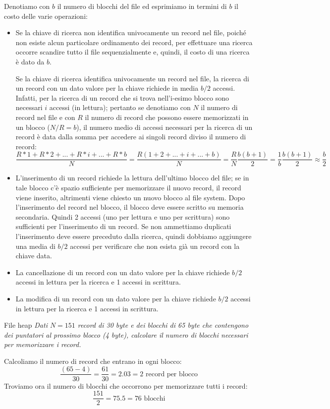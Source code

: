 Denotiamo con $b$ il numero di blocchi del file ed esprimiamo in termini di $b$ il costo delle varie operazioni:
\begin{itemize}
    \item Se la chiave di ricerca non identifica univocamente un record nel file, poiché non esiste alcun particolare ordinamento dei record, per effettuare una ricerca occorre scandire tutto il file sequenzialmente e, quindi, il costo di una ricerca è dato da $b$. 

    Se la chiave di ricerca identifica univocamente un record nel file, la ricerca di un record con un dato valore per la chiave richiede in media $b/2$ accessi. Infatti, per la ricerca di un record che si trova nell'i-esimo blocco sono necessari $i$ accessi (in lettura); pertanto se denotiamo con $N$ il numero di record nel file e con $R$ il numero di record che possono essere memorizzati in un blocco ($N/R=b$), il numero medio di accessi necessari per la ricerca di un record è data dalla somma per accedere ai singoli record diviso il numero di record:
    \begin{equation*}
        \frac{R*1+R*2+...+R*i+...+R*b}{N}=\frac{R(1+2+...+i+...+b)}{N}=\frac{R}{N}\frac{b(b+1)}{2}=\frac{1}{b}\frac{b(b+1)}{2}\approx \frac{b}{2}
    \end{equation*}
    \item L'inserimento di un record richiede la lettura dell'ultimo blocco del file; se in tale blocco c'è spazio sufficiente per memorizzare il nuovo record, il record viene inserito, altrimenti viene chiesto un nuovo blocco al file system. Dopo l'inserimento del record nel blocco, il blocco deve essere scritto su memoria secondaria. Quindi 2 accessi (uno per lettura e uno per scrittura) sono sufficienti per l'inserimento di un record. Se non ammettiamo duplicati l'inserimento deve essere preceduto dalla ricerca, quindi dobbiamo aggiungere una media di $b/2$ accessi per verificare che non esista già un record con la chiave data.
    \item La cancellazione di un record con un dato valore per la chiave richiede $b/2$ accessi in lettura per la ricerca e 1 accessi in scrittura.
    \item La modifica di un record con un dato valore per la chiave richiede $b/2$ accessi in lettura per la ricerca e 1 accessi in scrittura.
\end{itemize}

\begin{Example}{File heap}{}
    \textit{Dati $N=151$ record di 30 byte e dei blocchi di 65 byte che contengono dei puntatori al prossimo blocco (4 byte), calcolare il numero di blocchi necessari per memorizzare i record.}

    Calcoliamo il numero di record che entrano in ogni blocco:
    \begin{equation*}
        \frac{(65-4)}{30}=\frac{61}{30}=2.03=2\mbox{ record per blocco}
    \end{equation*}
    Troviamo ora il numero di blocchi che occorrono per memorizzare tutti i record:
    \begin{equation*}
        \frac{151}{2}=75.5=76\mbox{ blocchi}
    \end{equation*}
\end{Example}

